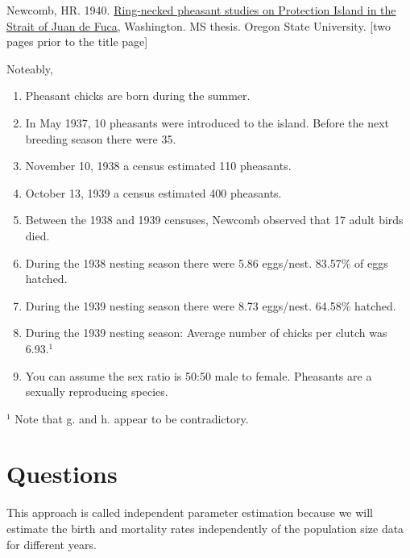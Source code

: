 \documentclass[
]{book}
\providecommand{\tightlist}{%
  \setlength{\itemsep}{0pt}\setlength{\parskip}{0pt}}
\begin{document}
Newcomb, HR. 1940. \href{https://ir.library.oregonstate.edu/concern/graduate_thesis_or_dissertations/js956j801?locale=en}{Ring-necked pheasant studies on Protection Island in the Strait of Juan de Fuca}, Washington. MS thesis. Oregon State University. {[}two pages prior to the title page{]}

Noteably,

\begin{enumerate}
\def\labelenumi{\alph{enumi}.}
\tightlist
\item
  Pheasant chicks are born during the summer.
\item
  In May 1937, 10 pheasants were introduced to the island. Before the next breeding season there were 35.
\item
  November 10, 1938 a census estimated 110 pheasants.
\item
  October 13, 1939 a census estimated 400 pheasants.
\item
  Between the 1938 and 1939 censuses, Newcomb observed that 17 adult birds died.
\item
  During the 1938 nesting season there were 5.86 eggs/nest. 83.57\% of eggs hatched.
\item
  During the 1939 nesting season there were 8.73 eggs/nest. 64.58\% hatched.
\item
  During the 1939 nesting season: Average number of chicks per clutch was 6.93.\(^1\)
\item
  You can assume the sex ratio is 50:50 male to female. Pheasants are a sexually reproducing species.
\end{enumerate}

\(^1\) Note that g. and h. appear to be contradictory.

\hypertarget{questions}{%
\section{Questions}\label{questions}}

This approach is called independent parameter estimation because we will estimate the birth and mortality rates independently of the population size data for different years.
\end{document}
